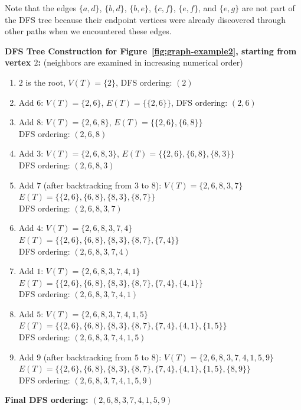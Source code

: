 \documentclass{article}
\theoremstyle{definition}
\begin{document}
Note that the edges $\{a, d\}$, $\{b, d\}$, $\{b, e\}$, $\{c, f\}$, 
$\{e, f\}$, and $\{e, g\}$ are not part of the DFS tree because their endpoint vertices 
were already discovered through other paths when we encountered these edges.

\noindent\textbf{DFS Tree Construction for Figure~\ref{fig:graph-example2}, starting from vertex $2$:} (neighbors are examined in increasing numerical order)
\begin{enumerate}
\item $2$ is the root, $V(T) = \{2\}$, DFS ordering: $(2)$
\item Add $6$: $V(T) = \{2, 6\}$, $E(T) = \{\{2, 6\}\}$, DFS ordering: $(2, 6)$
\item Add $8$: $V(T) = \{2, 6, 8\}$, $E(T) = \{\{2, 6\}, \{6, 8\}\}$\\
   DFS ordering: $(2, 6, 8)$
\item Add $3$: $V(T) = \{2, 6, 8, 3\}$, $E(T) = \{\{2, 6\}, \{6, 8\}, \{8, 3\}\}$\\
   DFS ordering: $(2, 6, 8, 3)$
\item Add $7$ (after backtracking from $3$ to $8$): $V(T) = \{2, 6, 8, 3, 7\}$\\
   $E(T) = \{\{2, 6\}, \{6, 8\}, \{8, 3\}, \{8, 7\}\}$\\
   DFS ordering: $(2, 6, 8, 3, 7)$
\item Add $4$: $V(T) = \{2, 6, 8, 3, 7, 4\}$\\
   $E(T) = \{\{2, 6\}, \{6, 8\}, \{8, 3\}, \{8, 7\}, \{7, 4\}\}$\\
   DFS ordering: $(2, 6, 8, 3, 7, 4)$
\item Add $1$: $V(T) = \{2, 6, 8, 3, 7, 4, 1\}$\\
   $E(T) = \{\{2, 6\}, \{6, 8\}, \{8, 3\}, \{8, 7\}, \{7, 4\}, \{4, 1\}\}$\\
   DFS ordering: $(2, 6, 8, 3, 7, 4, 1)$
\item Add $5$: $V(T) = \{2, 6, 8, 3, 7, 4, 1, 5\}$\\
   $E(T) = \{\{2, 6\}, \{6, 8\}, \{8, 3\}, \{8, 7\}, \{7, 4\}, \{4, 1\}, \{1, 5\}\}$\\
   DFS ordering: $(2, 6, 8, 3, 7, 4, 1, 5)$
\item Add $9$ (after backtracking from $5$ to $8$): $V(T) = \{2, 6, 8, 3, 7, 4, 1, 5, 9\}$\\
   $E(T) = \{\{2, 6\}, \{6, 8\}, \{8, 3\}, \{8, 7\}, \{7, 4\}, \{4, 1\}, \{1, 5\}, \{8, 9\}\}$\\
   DFS ordering: $(2, 6, 8, 3, 7, 4, 1, 5, 9)$
\end{enumerate}
\textbf {Final DFS ordering: $(2, 6, 8, 3, 7, 4, 1, 5, 9)$}
\end{document}
